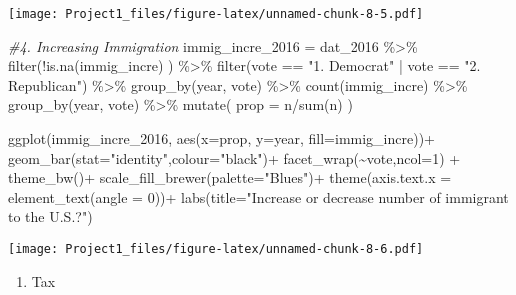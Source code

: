 \documentclass[
]{article}
\newenvironment{Shaded}{\begin{snugshade}}{\end{snugshade}}
\newcommand{\AttributeTok}[1]{\textcolor[rgb]{0.77,0.63,0.00}{#1}}
\newcommand{\CommentTok}[1]{\textcolor[rgb]{0.56,0.35,0.01}{\textit{#1}}}
\newcommand{\DecValTok}[1]{\textcolor[rgb]{0.00,0.00,0.81}{#1}}
\newcommand{\FunctionTok}[1]{\textcolor[rgb]{0.00,0.00,0.00}{#1}}
\newcommand{\NormalTok}[1]{#1}
\newcommand{\OtherTok}[1]{\textcolor[rgb]{0.56,0.35,0.01}{#1}}
\newcommand{\SpecialCharTok}[1]{\textcolor[rgb]{0.00,0.00,0.00}{#1}}
\newcommand{\StringTok}[1]{\textcolor[rgb]{0.31,0.60,0.02}{#1}}
\providecommand{\tightlist}{%
  \setlength{\itemsep}{0pt}\setlength{\parskip}{0pt}}
\begin{document}
\texttt{[image: Project1\_files/figure-latex/unnamed-chunk-8-5.pdf]}

\begin{Shaded}
\begin{Highlighting}[]
\CommentTok{\#4. Increasing Immigration}
\NormalTok{immig\_incre\_2016 }\OtherTok{=}\NormalTok{ dat\_2016 }\SpecialCharTok{\%\textgreater{}\%}
  \FunctionTok{filter}\NormalTok{(}\SpecialCharTok{!}\FunctionTok{is.na}\NormalTok{(immig\_incre) ) }\SpecialCharTok{\%\textgreater{}\%}
  \FunctionTok{filter}\NormalTok{(vote }\SpecialCharTok{==} \StringTok{"1. Democrat"} \SpecialCharTok{|}\NormalTok{ vote }\SpecialCharTok{==} \StringTok{"2. Republican"}\NormalTok{) }\SpecialCharTok{\%\textgreater{}\%}
  \FunctionTok{group\_by}\NormalTok{(year, vote) }\SpecialCharTok{\%\textgreater{}\%}
  \FunctionTok{count}\NormalTok{(immig\_incre) }\SpecialCharTok{\%\textgreater{}\%}
  \FunctionTok{group\_by}\NormalTok{(year, vote) }\SpecialCharTok{\%\textgreater{}\%}
  \FunctionTok{mutate}\NormalTok{(}
    \AttributeTok{prop =}\NormalTok{ n}\SpecialCharTok{/}\FunctionTok{sum}\NormalTok{(n)}
\NormalTok{  )}

\FunctionTok{ggplot}\NormalTok{(immig\_incre\_2016,}
       \FunctionTok{aes}\NormalTok{(}\AttributeTok{x=}\NormalTok{prop, }\AttributeTok{y=}\NormalTok{year, }\AttributeTok{fill=}\NormalTok{immig\_incre))}\SpecialCharTok{+}
  \FunctionTok{geom\_bar}\NormalTok{(}\AttributeTok{stat=}\StringTok{"identity"}\NormalTok{,}\AttributeTok{colour=}\StringTok{"black"}\NormalTok{)}\SpecialCharTok{+}
  \FunctionTok{facet\_wrap}\NormalTok{(}\SpecialCharTok{\textasciitilde{}}\NormalTok{vote,}\AttributeTok{ncol=}\DecValTok{1}\NormalTok{) }\SpecialCharTok{+}
  \FunctionTok{theme\_bw}\NormalTok{()}\SpecialCharTok{+}
  \FunctionTok{scale\_fill\_brewer}\NormalTok{(}\AttributeTok{palette=}\StringTok{"Blues"}\NormalTok{)}\SpecialCharTok{+}
  \FunctionTok{theme}\NormalTok{(}\AttributeTok{axis.text.x =} \FunctionTok{element\_text}\NormalTok{(}\AttributeTok{angle =} \DecValTok{0}\NormalTok{))}\SpecialCharTok{+}
  \FunctionTok{labs}\NormalTok{(}\AttributeTok{title=}\StringTok{"Increase or decrease number of immigrant to the U.S.?"}\NormalTok{)}
\end{Highlighting}
\end{Shaded}

\texttt{[image: Project1\_files/figure-latex/unnamed-chunk-8-6.pdf]}

\begin{enumerate}
\def\labelenumi{\arabic{enumi}.}
\setcounter{enumi}{3}
\tightlist
\item
  Tax
\end{enumerate}
\end{document}
